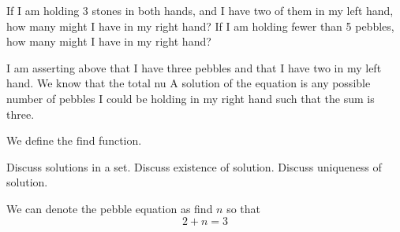 
\sbasic











\sstart
{}


If I am holding
3 stones
in both hands,
and I have two of
them in my left hand,
how many might I have
in my right hand?
If I am holding
fewer than 5 pebbles, how
many might I have in my right hand?


I am
asserting above
that I have three
pebbles and that
I have two in my
left hand.
We know that the
total nu
A solution of
the equation
is any possible
number of pebbles
I could be holding
in my right hand
such that the sum
is three.

We define the $\text{find}$
function.

Discuss solutions
in a set.
Discuss existence
of solution.
Discuss uniqueness
of solution.


We can
denote the pebble
equation as
find $n$ so that
\[
  2 + n = 3
\]
\strats
